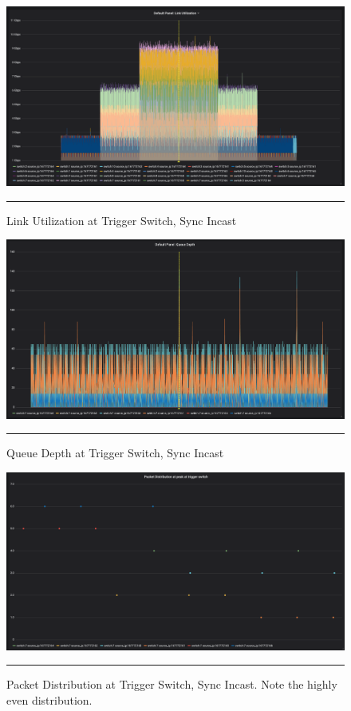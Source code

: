 \begin{figure}[htbp]
	\centering
		\includegraphics[width=1.0\columnwidth]{Figures/link_utilization_sync.png}
		\rule{35em}{0.5pt}
	\caption[Link Utilization at Trigger Switch, Sync Incast]{Link Utilization at Trigger Switch, Sync Incast}
	\label{fig:link_utilization_sync}
\end{figure}
\begin{figure}[htbp]
	\centering
		\includegraphics[width=1.0\columnwidth]{Figures/queue_depth_sync.png}
		\rule{35em}{0.5pt}
	\caption[Queue Depth at Trigger Switch, Sync Incast]{Queue Depth at Trigger Switch, Sync Incast}
	\label{fig:queue_depth_sync}
\end{figure}
\begin{figure}[htbp]
	\centering
		\includegraphics[width=1.0\columnwidth]{Figures/distribution_sync.png}
		\rule{35em}{0.5pt}
	\caption[Packet Distribution at Trigger Switch, Sync Incast]{Packet Distribution at Trigger Switch, Sync Incast. Note the highly even distribution.}
	\label{fig:distribution_sync}
\end{figure}

